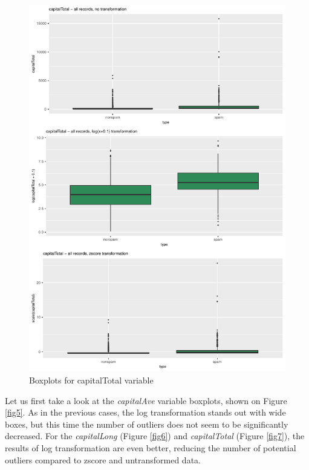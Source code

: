 \documentclass{article}\usepackage[]{graphicx}\usepackage[]{xcolor}
\makeatletter
\def\maxwidth{ %
  \ifdim\Gin@nat@width>\linewidth
    \linewidth
  \else
    \Gin@nat@width
  \fi
}
\newenvironment{knitrout}{}{} %
\makeatother
\begin{document}
\begin{knitrout}
\color{fgcolor}\begin{figure}[h]
\includegraphics[width=\maxwidth]{figure/capitalTotalBox-1} \caption[\label{fig7} Boxplots for capitalTotal variable]{\label{fig7} Boxplots for capitalTotal variable}\label{fig:capitalTotalBox}
\end{figure}

\end{knitrout}

Let us first take a look at the \textit{capitalAve} variable boxplots, shown on Figure \ref{fig5}.
As in the previous cases, the log transformation stands out with wide boxes, but this time the number 
of outliers does not seem to be significantly decreased. For the \textit{capitalLong}
(Figure \ref{fig6}) and \textit{capitalTotal} (Figure \ref{fig7}), the results of 
log transformation are even better, reducing the number of potential outliers compared
to zscore and untransformed data.
\end{document}
